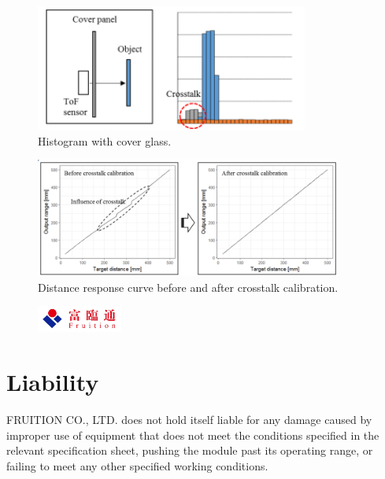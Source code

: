 \documentclass{scrreprt}
\newcommand{\pchapter}[1]{
	\begingroup\let\clearpage\relax
	\newpage
	\begin{figure}[H]
		\includegraphics[width=0.25\textwidth]{logo.jpeg}
	\end{figure}
	\chapter{#1}
	\endgroup
}
\begin{document}
\begin{CJK*}{UTF8}{gbsn}
\begin{figure}[H]
\center\includegraphics[width=0.8\textwidth]{hist_glass.png}
\caption{Histogram with cover glass.}
\label{fig:cover}
\end{figure}

\begin{figure}[H]
\center\includegraphics[width=0.9\textwidth]{crosstalk_calib.png}
\caption{Distance response curve before and after crosstalk calibration.}
\label{fig:curve}
\end{figure}

\pchapter{Liability}
FRUITION CO., LTD. does not hold itself liable for any damage caused by improper
use of equipment that does not meet the conditions specified in the relevant
specification sheet, pushing the module past its operating range, or failing to
meet any other specified working conditions.

\end{CJK*}
\end{document}
